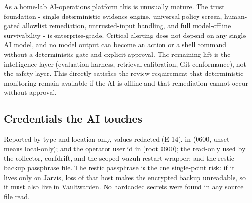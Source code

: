 \begin{callout}[title=Assessment]
As a home-lab AI-operations platform this is unusually mature. The trust foundation - single
deterministic evidence engine, universal policy screen, human-gated allowlist remediation,
untrusted-input handling, and full model-offline survivability - is enterprise-grade. Critical
alerting does not depend on any single AI model, and no model output can become an action or a
shell command without a deterministic gate and explicit approval. The remaining lift is the
intelligence layer (evaluation harness, retrieval calibration, Git conformance), not the safety
layer. This directly satisfies the review requirement that deterministic monitoring remain
available if the AI is offline and that remediation cannot occur without approval.
\end{callout}

\subsection{Credentials the AI touches}

Reported by type and location only, values redacted (E-14).  in
 (0600, unset means local-only);  and the
operator user id in  (root 0600); the read-only 
used by the collector, confdrift, and the scoped wazuh-restart wrapper; and the restic backup
passphrase file. The restic passphrase is the one single-point risk: if it lives only on Jarvis,
loss of that host makes the encrypted backup unreadable, so it must also live in Vaultwarden.
No hardcoded secrets were found in any source file read.
